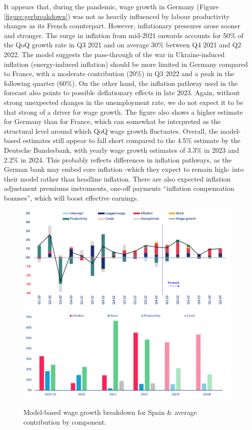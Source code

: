 It appears that, during the pandemic, wage growth in Germany (Figure \ref{figure:gerbreakdown}) was not as heavily influenced by labour productivity changes as its French counterpart. 
However, inflationary pressures arose sooner and stronger. 
The surge in inflation from mid-2021 onwards accounts for 50\% of the QoQ growth rate in Q3 2021 and on average 30\% between Q4 2021 and Q2 2022. 
The model suggests the pass-through of the war in Ukraine-induced inflation (energy-induced inflation) should be more limited in Germany compared to France, with a moderate contribution (20\%) in Q3 2022 and a peak in the following quarter (60\%). 
On the other hand, the inflation pathway used in the forecast also points to possible deflationary effects in late 2023. 
Again, without strong unexpected changes in the unemployment rate, we do not expect it to be that strong of a driver for wage growth. 
The figure also shows a higher estimate for Germany than for France, which can somewhat be interpreted as the structural level around which QoQ wage growth fluctuates. 
Overall, the model-based estimates still appear to fall short compared to the 4.5\% estimate by the Deutsche Bundesbank, with yearly wage growth estimates of 3.3\% in 2023 and 2.2\% in 2024. 
This probably reflects differences in inflation pathways, as the German bank may embed core inflation -which they expect to remain high- into their model rather than headline inflation. 
There are also expected inflation adjustment premiums instruments, one-off payments “inflation compensation bonuses”, which will boost effective earnings. 

\begin{figure}[H]
    \centering
    \caption{Model-based wage growth breakdown for Spain \& average contribution by component.}
    \includegraphics[width=.8\textwidth]{Core/2.Labour/img/spainb1.png}
    \includegraphics[width=.8\textwidth]{Core/2.Labour/img/spainb2.png}
    \label{figure:spbreakdown}
\end{figure}

